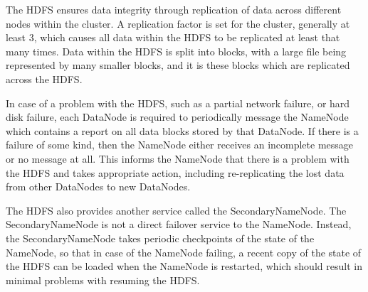 The HDFS ensures data integrity through replication of data across different nodes within the cluster. A replication factor is set for the cluster, generally at least 3, which causes all data within the HDFS to be replicated at least that many times. Data within the HDFS is split into blocks, with a large file being represented by many smaller blocks, and it is these blocks which are replicated across the HDFS.

In case of a problem with the HDFS, such as a partial network failure, or hard disk failure, each DataNode is required to periodically message the NameNode which contains a report on all data blocks stored by that DataNode. If there is a failure of some kind, then the NameNode either receives an incomplete message or no message at all. This informs the NameNode that there is a problem with the HDFS and takes appropriate action, including re-replicating the lost data from other DataNodes to new DataNodes.

The HDFS also provides another service called the SecondaryNameNode. The SecondaryNameNode is not a direct failover service to the NameNode. Instead, the SecondaryNameNode takes periodic checkpoints of the state of the NameNode, so that in case of the NameNode failing, a recent copy of the state of the HDFS can be loaded when the NameNode is restarted, which should result in minimal problems with resuming the HDFS.